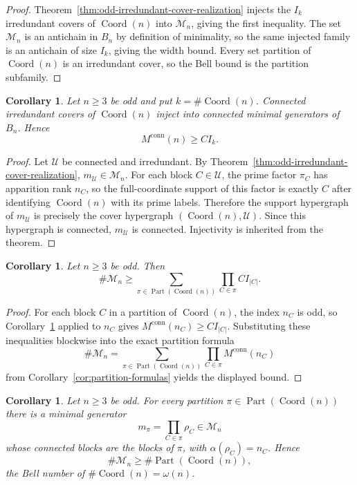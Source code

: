 \documentclass[11pt,letterpaper]{article}
\numberwithin{equation}{section}
\theoremstyle{plain}
\newtheorem{corollary}[theorem]{Corollary}
\theoremstyle{definition}
\theoremstyle{remark}
\DeclareMathOperator{\Part}{Part}
\DeclareMathOperator{\Coord}{Coord}
\begin{document}
\begin{proof}
Theorem~\ref{thm:odd-irredundant-cover-realization} injects the \(I_k\)
irredundant covers of \(\Coord(n)\) into \(\mathcal M_n\), giving the first
inequality. The set \(\mathcal M_n\) is an antichain in \(B_n\) by definition
of minimality, so the same injected family is an antichain of size \(I_k\),
giving the width bound. Every set partition of \(\Coord(n)\) is an
irredundant cover, so the Bell bound is the partition subfamily.
\end{proof}

\begin{corollary}\label{cor:connected-irredundant-cover-bound}
Let \(n\ge3\) be odd and put \(k=\#\Coord(n)\). Connected irredundant covers of
\(\Coord(n)\) inject into connected minimal generators of \(B_n\). Hence
\[
M^{\mathrm{conn}}(n)\ge CI_k.
\]
\end{corollary}

\begin{proof}
Let \(\mathcal U\) be connected and irredundant. By
Theorem~\ref{thm:odd-irredundant-cover-realization},
\(m_{\mathcal U}\in\mathcal M_n\). For each block \(C\in\mathcal U\), the prime
factor \(\pi_C\) has apparition rank \(n_C\), so the full-coordinate support of
this factor is exactly \(C\) after identifying \(\Coord(n)\) with its prime
labels. Therefore the support hypergraph of \(m_{\mathcal U}\) is precisely
the cover hypergraph \((\Coord(n),\mathcal U)\). Since this hypergraph is
connected, \(m_{\mathcal U}\) is connected. Injectivity is inherited from the
theorem.
\end{proof}

\begin{corollary}\label{cor:partition-ci-lower-bound}
Let \(n\ge3\) be odd. Then
\[
\#\mathcal M_n\ge
\sum_{\pi\in\Part(\Coord(n))}\prod_{C\in\pi}CI_{|C|}.
\]
\end{corollary}

\begin{proof}
For each block \(C\) in a partition of \(\Coord(n)\), the index \(n_C\) is odd,
so Corollary~\ref{cor:connected-irredundant-cover-bound} applied to \(n_C\)
gives \(M^{\mathrm{conn}}(n_C)\ge CI_{|C|}\). Substituting these inequalities
blockwise into the exact partition formula
\[
\#\mathcal M_n=\sum_{\pi\in\Part(\Coord(n))}
\prod_{C\in\pi}M^{\mathrm{conn}}(n_C)
\]
from Corollary~\ref{cor:partition-formulas} yields the displayed bound.
\end{proof}

\begin{corollary}\label{cor:odd-primitive-cover-realization}
Let \(n\ge3\) be odd. For every partition
\(\pi\in\Part(\Coord(n))\) there is a minimal generator
\[
m_\pi=\prod_{C\in\pi}\rho_C\in\mathcal M_n
\]
whose connected blocks are the blocks of \(\pi\), with
\(\alpha(\rho_C)=n_C\). Hence
\[
\#\mathcal M_n\ge \#\Part(\Coord(n)),
\]
the Bell number of \(\#\Coord(n)=\omega(n)\).
\end{corollary}
\end{document}
